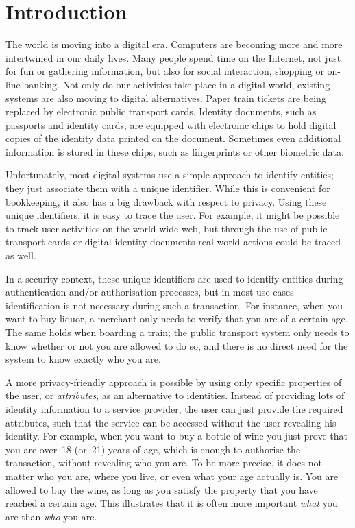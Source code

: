 \chapter{Introduction}

The world is moving into a digital era. Computers are becoming more and more
intertwined in our daily lives. Many people spend time on the Internet, not just
for fun or gathering information, but also for social interaction, shopping or
on-line banking. Not only do our activities take place in a digital world,
existing systems are also moving to digital alternatives. Paper train tickets
are being replaced by electronic public transport cards. Identity documents,
such as passports and identity cards, are equipped with electronic chips to hold
digital copies of the identity data printed on the document. Sometimes even
additional information is stored in these chips, such as fingerprints or other
biometric data.

Unfortunately, most digital systems use a simple approach to identify entities;
they just associate them with a unique identifier. While this is convenient for
bookkeeping, it also has a big drawback with respect to privacy. Using these
unique identifiers, it is easy to trace the user. For example, it might be
possible to track user activities on the world wide web, but through the use of
public transport cards or digital identity documents real world actions could be
traced as well.

In a security context, these unique identifiers are used to identify entities
during authentication and/or authorisation processes, but in most use cases
identification is not necessary during such a transaction. For instance, when
you want to buy liquor, a merchant only needs to verify that you are of a
certain age. The same holds when boarding a train; the public transport system
only needs to know whether or not you are allowed to do so, and there is no
direct need for the system to know exactly who you are.

A more privacy-friendly approach is possible by using only specific properties
of the user, or \emph{attributes}, as an alternative to
identities. Instead of providing lots of identity information to a service
provider, the user can just provide the required attributes, such that the
service can be accessed without the user revealing his identity. For example,
when you want to buy a bottle of wine you just prove that you are over~18
(or~21) years of age, which is enough to authorise the transaction, without
revealing who you are. To be more precise, it does not matter who you are, where
you live, or even what your age actually is. You are allowed to buy the wine, as
long as you satisfy the property that you have reached a certain age. This
illustrates that it is often more important \emph{what} you are than \emph{who}
you are.

